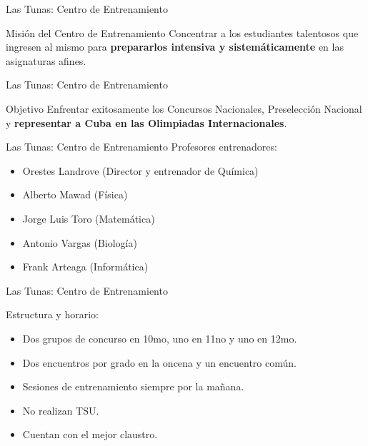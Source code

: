 \documentclass{beamer}
\begin{document}
\begin{frame}{\LARGE Las Tunas: Centro de Entrenamiento}
  \LARGE
  \begin{block}{Misi\'on del Centro de Entrenamiento} 
	Concentrar a los estudiantes talentosos que ingresen al mismo
	para \textbf{prepararlos intensiva y sistem\'aticamente} en las asignaturas afines.
  \end{block}
  
\end{frame}

\begin{frame}{\LARGE Las Tunas: Centro de Entrenamiento}
  \LARGE

 \begin{block}{Objetivo} 
	Enfrentar exitosamente los Concursos Nacionales, Preselecci\'on Nacional 
	y \textbf{representar a Cuba en las Olimpiadas Internacionales}.
 \end{block}
 
 \end{frame}

\begin{frame}{\LARGE Las Tunas: Centro de Entrenamiento}
  \LARGE
  Profesores entrenadores:
  \begin{itemize}
    \item Orestes Landrove (Director y entrenador de Qu\'imica)
    \pause
    \item Alberto Mawad (F\'isica)
    \pause
    \item Jorge Luis Toro (Matem\'atica)
    \pause
    \item Antonio Vargas (Biolog\'ia)
    \pause
    \item Frank Arteaga (Inform\'atica)
  \end{itemize}
\end{frame}

\begin{frame}{\LARGE Las Tunas: Centro de Entrenamiento}
  \LARGE
  \begin{block}{Estructura y horario:} 
	\begin{itemize}
	 \item Dos grupos de concurso en 10mo, uno en 11no y uno en 12mo. 
	 \pause \item Dos encuentros por grado en la oncena y un encuentro com\'un.
	 \pause \item Sesiones de entrenamiento siempre por la ma\~nana.
	 \pause \item No realizan TSU. 
	 \pause \item Cuentan con el mejor claustro. 
	\end{itemize}
  \end{block}

\end{frame}
\end{document}

